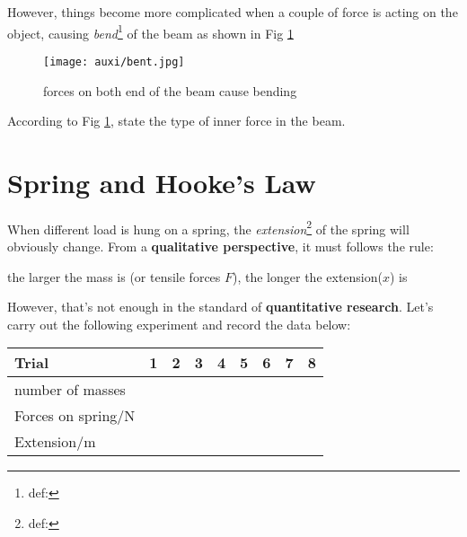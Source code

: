 \documentclass[a4paper]{tufte-handout}
\newenvironment{TaskBox} %
{\begin{tcolorbox}[breakable,colback=b1!30,colframe=b1,title=Task]} {\end{tcolorbox}}
\begin{document}
However, things become more complicated when a couple of force is acting on the object, causing \emph{bend}\footnote{def:} of the beam as shown in Fig \ref{fig:bend}
\begin{figure}
\centering
\texttt{[image: auxi/bent.jpg]}
\caption{forces on both end of the beam cause bending}
\label{fig:bend}
\end{figure}

\begin{TaskBox}
According to Fig \ref{fig:bend}, state the type of inner force in the beam.
\vspace{0.5in}
\end{TaskBox}

\section{Spring and Hooke's Law}
When different load is hung on a spring, the \emph{extension}\footnote{def:} of the spring will obviously change. From a \textbf{qualitative perspective}, it must follows the rule:
\begin{center}
the larger the mass is (or tensile forces $F$), the longer the extension($x$) is 
\end{center}
However, that's not enough in the standard of \textbf{quantitative research}. Let's carry out the following experiment and record the data below:
\begin{table}[]
\begin{tabular}{|l|l|l|l|l|l|l|l|l|}
\hline
Trial              & \multicolumn{1}{c|}{1} & \multicolumn{1}{c|}{2} & \multicolumn{1}{c|}{3} & \multicolumn{1}{c|}{4} & \multicolumn{1}{c|}{5} & \multicolumn{1}{c|}{6} & \multicolumn{1}{c|}{7} & \multicolumn{1}{c|}{8} \\ \hline
number of masses   &                        &                        &                        &                        &                        &                        &                        &                        \\ \hline
Forces on spring/N &                        &                        &                        &                        &                        &                        &                        &                        \\ \hline
Extension/m        &                        &                        &                        &                        &                        &                        &                        &                        \\ \hline
\end{tabular}
\end{table}
\end{document}
